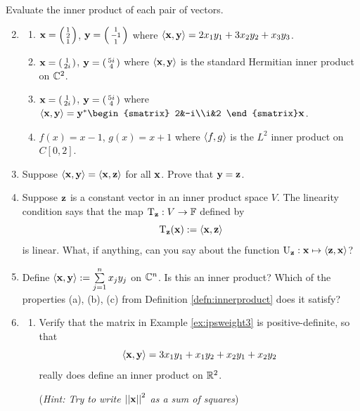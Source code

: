 \begin{exercises}
	\exstart Evaluate the inner product of each pair of vectors.
	\begin{enumerate}\setcounter{enumi}{1}
	  \item[]\begin{enumerate}
	    \item ${\mathbf{x}}=\left(\begin{smallmatrix}1\\2\\1\end{smallmatrix}\right)$, ${\mathbf{y}}=\left(\begin{smallmatrix}1\\-1\\1\end{smallmatrix}\right)$ where $\left\langle {\mathbf{x}},{\mathbf{y}}\right\rangle=2x_1y_1+3x_2y_2+x_3y_3$.
	    
	    \item ${\mathbf{x}}=\left(\begin{smallmatrix}1\\2i\end{smallmatrix}\right)$, ${\mathbf{y}}=\left(\begin{smallmatrix}5i\\4\end{smallmatrix}\right)$ where $\left\langle {\mathbf{x}},{\mathbf{y}}\right\rangle$ is the standard Hermitian inner product on $\mathbb{C}^2$.
	    
	    \item ${\mathbf{x}}=\left(\begin{smallmatrix}1\\2i\end{smallmatrix}\right)$, ${\mathbf{y}}=\left(\begin{smallmatrix}5i\\4\end{smallmatrix}\right)$ where $\ip{\vx,\vy}=\vy^*
	    \begin{smatrix}
	    	2&-i\\i&2
	    \end{smatrix}
	    \vx$.
	    
	    \item $f(x)=x-1$, $g(x)=x+1$ where $\left\langle f,g\right\rangle$ is the $L^2$ inner product on $C[0,2]$.
	  \end{enumerate}
	  
	  
	  \item Suppose $\left\langle {\mathbf{x}},{\mathbf{y}}\right\rangle=\left\langle {\mathbf{x}},{\mathbf{z}}\right\rangle$ for all ${\mathbf{x}}$. Prove that ${\mathbf{y}}={\mathbf{z}}$.
	  
	  
	  \item Suppose ${\mathbf{z}}$ is a constant vector in an inner product space $V$. The linearity condition says that the map $\mathrm{T}_{\mathbf{z}}:V\to\mathbb{F}$ defined by
	  \[
	  	\mathrm{T}_{\mathbf{z}}({\mathbf{x}}):=\left\langle {\mathbf{x}},{\mathbf{z}}\right\rangle
	  \]
	  is linear. What, if anything, can you say about the function $\mathrm{U}_{\mathbf{z}}:{\mathbf{x}}\mapsto\left\langle {\mathbf{z}},{\mathbf{x}}\right\rangle$?
	  
	  
	  \item Define $\left\langle {\mathbf{x}},{\mathbf{y}}\right\rangle:=\sum\limits_{j=1}^nx_jy_j$ on $\mathbb{C}^n$. Is this an inner product? Which of the properties (a), (b), (c) from Definition \ref{defn:innerproduct} does it satisfy?
	  
	  
	  \item\begin{enumerate}
	    \item Verify that the matrix in Example \ref{ex:ipsweight3} is positive-definite, so that
	    \[
	    	\left\langle {\mathbf{x}},{\mathbf{y}}\right\rangle=3x_1y_1+x_1y_2+x_2y_1+x_2y_2
	    \]
	    really does define an inner product on $\mathbb{R}^2$.\par
	  	(\emph{Hint: Try to write $\left| \left| {\mathbf{x}}\right|\right|^2$ as a sum of squares})
	  	

\end{enumerate}
\end{enumerate}
\end{exercises}
